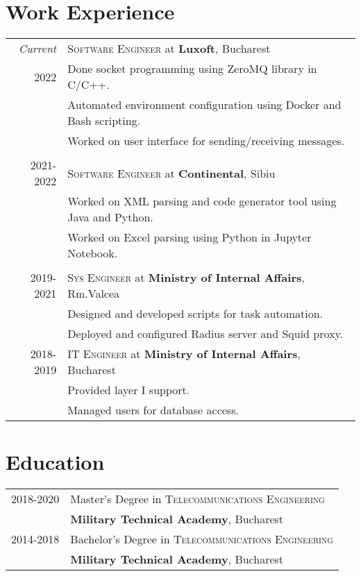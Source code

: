 \documentclass[a4paper,12pt]{article}
\begin{document}
\section{Work Experience}
\begin{tabular}{r|p{11cm}}

\emph{Current}
&\textsc{Software Engineer} at \textbf{Luxoft}, Bucharest\\
\textsc{2022}
&\footnotesize{Done socket programming using ZeroMQ library in C/C++.}\\
&\footnotesize{Automated environment configuration using Docker and Bash scripting.}\\
&\footnotesize{Worked on user interface for sending/receiving messages.}\\
\multicolumn{2}{c}{}\\
\textsc{2021-2022}
&\textsc{Software Engineer} at \textbf{Continental}, Sibiu\\
&\footnotesize{Worked on XML parsing and code generator tool using Java and Python.}\\
&\footnotesize{Worked on Excel parsing using Python in Jupyter Notebook.}\\
\multicolumn{2}{c}{}\\
\textsc{2019-2021} 
  &\textsc{Sys Engineer} at \textbf{Ministry of Internal Affairs}, Rm.Valcea\\
&\footnotesize{
  Designed and developed scripts for task automation.}\\
&\footnotesize{
  Deployed and configured Radius server and Squid proxy.}\\
\textsc{2018-2019} 
&\textsc{IT Engineer} at \textbf{Ministry of Internal Affairs}, Bucharest\\
&\footnotesize{Provided layer I support.}\\
&\footnotesize{Managed users for database access.}\\
\end{tabular}

\section{Education}
\begin{tabular}{rl}
\textsc{2018-2020}&Master's Degree in 
  \textsc{Telecommunications Engineering}\\
  &\textbf{Military Technical Academy}, Bucharest\\
\textsc{2014-2018}&Bachelor's Degree in
  \textsc{Telecommunications Engineering}\\
  &\textbf{Military Technical Academy}, Bucharest\\
\end{tabular}
\end{document}
